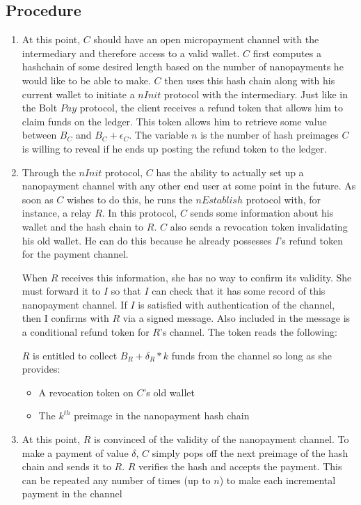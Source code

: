 \documentclass{article}
\begin{document}
\subsection{Procedure}
\begin{enumerate}
\item At this point, $C$ should have an open micropayment channel with the intermediary and therefore access to a valid wallet. $C$ first computes a hashchain of some desired length based on the number of nanopayments he would like to be able to make. $C$ then uses this hash chain along with his current wallet to initiate a $nInit$ protocol with the intermediary. Just like in the Bolt $Pay$ protocol, the client receives a refund token that allows him to claim funds on the ledger. This token allows him to retrieve some value between $B_C$ and $B_C + \epsilon_C$. The variable $n$ is the number of hash preimages $C$ is willing to reveal if he ends up posting the refund token to the ledger.

\item Through the $nInit$ protocol, $C$ has the ability to actually set up a nanopayment channel with any other end user at some point in the future. As soon as $C$ wishes to do this, he runs the $nEstablish$ protocol with, for instance, a relay $R$. In this protocol, $C$ sends some information about his wallet and the hash chain to $R$. $C$ also sends a revocation token invalidating his old wallet. He can do this because he already possesses $I$'s refund token for the payment channel.

When $R$ receives this information, she has no way to confirm its validity. She must forward it to $I$ so that $I$ can check that it has some record of this nanopayment channel. If $I$ is satisfied with authentication of the channel, then I confirms with $R$ via a signed message. Also included in the message is a conditional refund token for $R$'s channel. The token reads the following:

$R$ is entitled to collect $B_R + \delta_R * k$ funds from the channel so long as she provides:
\begin{itemize}
\item A revocation token on $C$'s old wallet
\item The $k^{th}$ preimage in the nanopayment hash chain
\end{itemize}

\item At this point, $R$ is convinced of the validity of the nanopayment channel. To make a payment  of value $\delta$, $C$ simply pops off the next preimage of the hash chain and sends it to $R$. $R$ verifies the hash and accepts the payment. This can be repeated any number of times (up to $n$) to make each incremental payment in the channel


\end{enumerate}
\end{document}

